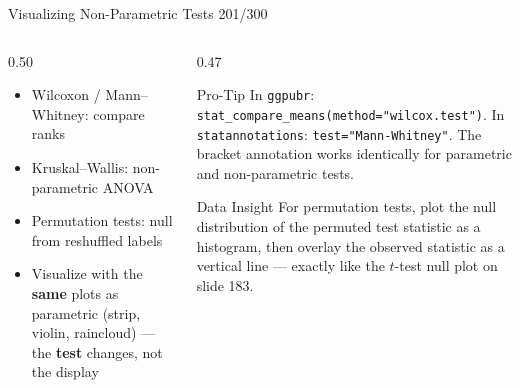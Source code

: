 \documentclass[10pt]{beamer}
\newcommand{\smark}[1]{\hfill{\scriptsize\color{codegray}#1}}
\begin{document}
\begin{frame}{Visualizing Non-Parametric Tests}
\smark{201/300}
\begin{columns}[T]
\begin{column}{0.50\textwidth}
\begin{itemize}
    \item Wilcoxon / Mann--Whitney: compare ranks
    \item Kruskal--Wallis: non-parametric ANOVA
    \item Permutation tests: null from reshuffled labels
    \item Visualize with the \textbf{same} plots as parametric (strip, violin, raincloud) --- the \textbf{test} changes, not the display
\end{itemize}
\end{column}
\begin{column}{0.47\textwidth}
\begin{alertblock}{Pro-Tip}
    \scriptsize In \texttt{ggpubr}: \texttt{stat\_compare\_means(method="wilcox.test")}. In \texttt{statannotations}: \texttt{test="Mann-Whitney"}. The bracket annotation works identically for parametric and non-parametric tests.
\end{alertblock}
\vspace{0.1cm}
\begin{exampleblock}{Data Insight}
    \scriptsize For permutation tests, plot the null distribution of the permuted test statistic as a histogram, then overlay the observed statistic as a vertical line --- exactly like the $t$-test null plot on slide 183.
\end{exampleblock}
\end{column}
\end{columns}
\end{frame}
\end{document}

